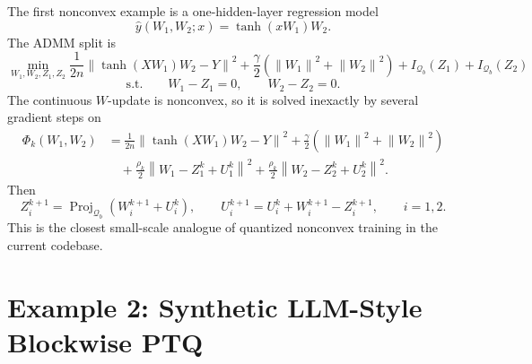 \documentclass[11pt]{article}
\newcommand{\proj}{\operatorname{Proj}}
\newcommand{\norm}[1]{\left\lVert #1 \right\rVert}
\newcommand{\Q}{\mathcal{Q}}
\begin{document}
The first nonconvex example is a one-hidden-layer regression model
\begin{equation}
    \widehat y(W_1,W_2;x)=\tanh(xW_1)W_2.
\end{equation}
The ADMM split is
\begin{equation}
    \min_{W_1,W_2,Z_1,Z_2}
    \frac{1}{2n}\norm{\tanh(XW_1)W_2-Y}^2
    +\frac{\gamma}{2}(\norm{W_1}^2+\norm{W_2}^2)
    +I_{\Q_b}(Z_1)+I_{\Q_b}(Z_2)
\end{equation}
\begin{equation}
    \text{s.t.}\qquad W_1-Z_1=0,\qquad W_2-Z_2=0.
\end{equation}
The continuous \(W\)-update is nonconvex, so it is solved inexactly by several
gradient steps on
\begin{align}
    \Phi_k(W_1,W_2)
    &=
    \frac{1}{2n}\norm{\tanh(XW_1)W_2-Y}^2
    +\frac{\gamma}{2}(\norm{W_1}^2+\norm{W_2}^2)\\
    &\quad
    +\frac{\rho_k}{2}\norm{W_1-Z_1^k+U_1^k}^2
    +\frac{\rho_k}{2}\norm{W_2-Z_2^k+U_2^k}^2.
\end{align}
Then
\begin{equation}
    Z_i^{k+1}=\proj_{\Q_b}(W_i^{k+1}+U_i^k),
    \qquad
    U_i^{k+1}=U_i^k+W_i^{k+1}-Z_i^{k+1},
    \qquad i=1,2.
\end{equation}
This is the closest small-scale analogue of quantized nonconvex training in
the current codebase.

\section{Example 2: Synthetic LLM-Style Blockwise PTQ}
\end{document}
